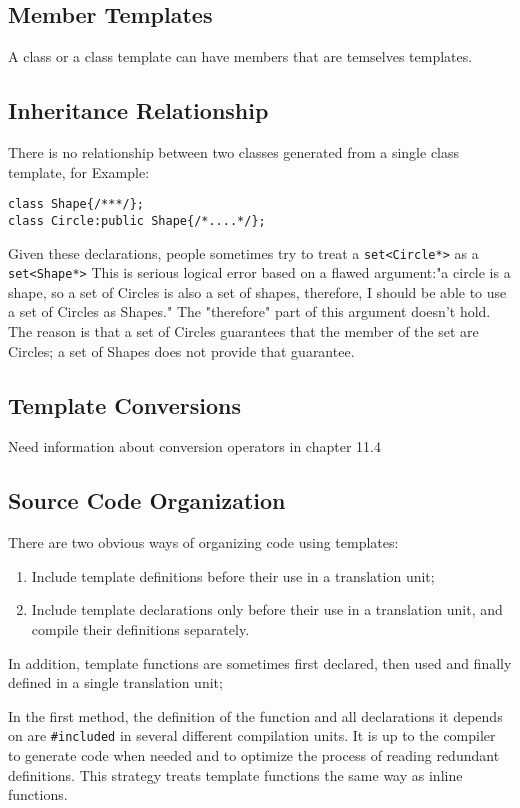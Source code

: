 \documentclass[a4paper,12pt]{book}
\begin{document}
\subsection{Member Templates}
A class or a class template can have members that are temselves templates.
\subsection{Inheritance Relationship}
There is no relationship between two classes generated from a single class template, for Example:
\begin{verbatim}
class Shape{/***/};
class Circle:public Shape{/*....*/};
\end{verbatim}
Given these declarations, people sometimes try to treat a \verb|set<Circle*>| as a \verb|set<Shape*>|
This is serious logical error based on a flawed argument:"a circle is a shape, so a set of Circles is also a set of shapes, therefore, I should be able to use a set of Circles as Shapes." The "therefore" part of this argument doesn't hold. The reason is that a set of Circles guarantees that the member of the set are Circles; a set of Shapes does not provide that guarantee.
\subsection{Template Conversions}
Need information about conversion operators in chapter 11.4
\subsection {Source Code Organization}
There are two obvious ways of organizing code using templates:
\begin{enumerate}
\item Include template definitions before their use in a translation unit;
\item Include template declarations only before their use in a translation unit, and compile their definitions separately.
\end{enumerate} In addition, template functions are sometimes first declared, then used and finally defined in a single translation unit;

In the first method, the definition of the function and all declarations it depends on are \verb|#included| in several different compilation units. It is up to the compiler to generate code when needed and to optimize the process of reading redundant definitions. This strategy treats template functions the same way as inline functions.
\end{document}
